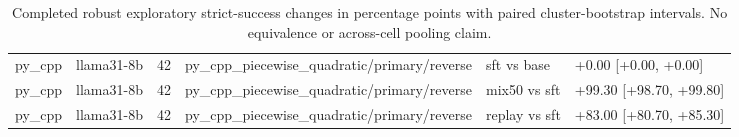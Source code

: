 \begin{table}[t]
\begin{tabular}{llllll}
py\_cpp & llama31-8b & 42 & py\_cpp\_piecewise\_quadratic/primary/reverse & sft vs base & +0.00 [+0.00, +0.00] \\
py\_cpp & llama31-8b & 42 & py\_cpp\_piecewise\_quadratic/primary/reverse & mix50 vs sft & +99.30 [+98.70, +99.80] \\
py\_cpp & llama31-8b & 42 & py\_cpp\_piecewise\_quadratic/primary/reverse & replay vs sft & +83.00 [+80.70, +85.30] \\
\bottomrule
\end{tabular}
\caption{Completed robust exploratory strict-success changes in percentage points with paired cluster-bootstrap intervals. No equivalence or across-cell pooling claim.}
\end{table}
